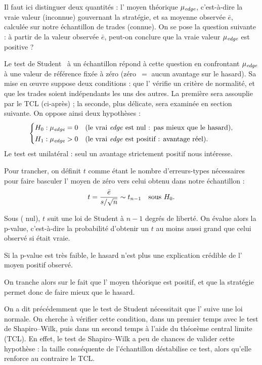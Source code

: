 Il faut ici distinguer deux quantités : l'\edgevar{} moyen
théorique \(\mu_{\textit{edge}}\), c'est-à-dire la vraie valeur (inconnue)
gouvernant la stratégie, et sa moyenne
observée \(\bar e\), calculée sur notre échantillon de trades
(connue). On se pose la question suivante : à partir de la valeur observée
\(\bar e\), peut-on conclure que la vraie valeur \(\mu_{\textit{edge}}\) est
positive ?

Le test de Student~\cite{student1908} à un échantillon répond à cette question en confrontant
\(\mu_{\textit{edge}}\) à une valeur de référence fixée à zéro (zéro~$=$ aucun
avantage sur le hasard). Sa mise en \oe uvre suppose deux conditions : que l'\edgevar{}
vérifie un critère de normalité, et que les trades soient indépendants les uns des autres.
La première sera assouplie par le TCL (ci-après) ; 
la seconde, plus délicate, sera examinée en section suivante. On oppose ainsi deux
hypothèses :
\[
  \begin{cases}
    H_0 : \mu_{\textit{edge}} = 0 & \text{(le vrai \textit{edge}{} est nul : pas mieux que le hasard),}\\[2pt]
    H_1 : \mu_{\textit{edge}} > 0 & \text{(le vrai \textit{edge}{} est positif : avantage réel).}
  \end{cases}
\]
Le test est unilatéral : seul un avantage strictement positif nous
intéresse.

Pour trancher, on définit \(t\) comme étant le nombre d'erreurs-types
nécessaires pour faire basculer l'\edgevar{} moyen de zéro vers celui obtenu
dans notre échantillon :
\[
  t = \frac{\bar e}{s/\sqrt{n}} \sim t_{n-1} \quad\text{sous } H_0 .
\]

Sous \Hzero{} (\edgevar{} nul), \(t\) suit une loi de Student à \(n-1\) degrés
de liberté. On évalue alors la p-value, c'est-à-dire la probabilité
d'obtenir un \(t\) au moins aussi grand que celui observé si \Hzero{}
était vraie.

Si la p-value est très faible, le hasard n'est plus une
explication crédible de l'\edgevar{} moyen positif observé.

On tranche alors sur le fait que l'\edgevar{} moyen théorique est positif, et que la
stratégie permet donc de faire mieux que le hasard.


On a dit précédemment que le test de Student nécessitait que l'\edgevar{} suive
une loi normale. On cherche à vérifier cette condition, dans un premier
temps avec le test de Shapiro--Wilk, puis dans un second temps à l'aide du
théorème central limite (TCL). En effet, le test de Shapiro--Wilk a peu de
chances de valider cette hypothèse : la taille conséquente de l'échantillon
déstabilise ce test, alors qu'elle renforce au contraire le TCL.

